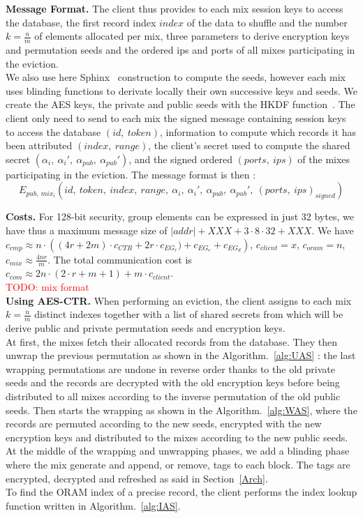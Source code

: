 \documentclass{llncs}
\newcommand{\todo}[1]{\textcolor{red}{TODO: #1}}
\begin{document}
\noindent\textbf{Message Format.}
The client thus provides to each mix session keys to access the database, the first record index $index$ of the data to shuffle and the number $k=\frac{n}{m}$ of elements allocated per mix, three parameters to derive encryption keys and permutation seeds and the ordered ips and ports of all mixes participating in the eviction.\\
We also use here Sphinx~\cite{danezis2009sphinx} construction to compute the seeds, however each mix uses blinding functions to derivate locally their own successive keys and seeds. 
We create the AES keys, the private and public seeds with the HKDF function~\cite{krawczyk2010cryptographic}. The client only need to send to each mix the signed message containing session keys to access the database $(id,\ token)$, information to compute which records it has been attributed $(index,\ range)$, the client's secret used to compute the shared secret $(\alpha_i,\ \alpha_i',\ \alpha_{pub},\ \alpha_{pub}')$, and the signed ordered $(ports,\ ips)$ of the mixes participating in the eviction.
The message format is then : $$E_{pub,\ mix_i}\left (id,\ token,\ index,\ range,\ \alpha_i,\ \alpha_i',\ \alpha_{pub},\ \alpha_{pub}',\ (port	s,\ ips)_{signed}\right )$$

\noindent\textbf{Costs.} For 128-bit security, group elements can be expressed in just 32 bytes, we have thus a maximum message size of $|addr|+XXX + 3 \cdot 8 \cdot 32 + XXX$. We have $c_{cmp} \approx n \cdot \left ( (4r+2m) \cdot c_{CTR} + 2 r \cdot c_{EG_r}) + c_{EG_e}+ c_{EG_d} \right ) $, $c_{client}= x$, $c_{oram}=n$, $c_{mix}\approx\frac{4nr}{m}$. The total communication cost is $c_{com}\approx 2n\cdot (2\cdot r+m+1) + m\cdot c_{client}$.\\\todo{ mix format}\\


\noindent\textbf{Using AES-CTR.}
When performing an eviction, the client assigns to each mix  $k=\frac{n}{m}$ distinct indexes together with a list of shared secrets from which will be derive public and private permutation seeds and encryption keys.\\
At first, the mixes fetch their allocated records from the database. They then unwrap the previous permutation as shown in the Algorithm.~\ref{alg:UAS} : the last wrapping permutations are undone in reverse order thanks to the old private seeds and the records are decrypted with the old encryption keys before being distributed to all mixes according to the inverse permutation of the old public seeds. Then starts the wrapping as shown in the Algorithm.~\ref{alg:WAS}, where the records are permuted according to the new seeds, encrypted with the new encryption keys and distributed to the mixes according to the new public seeds. At the middle of the wrapping and unwrapping phases, we add a blinding phase where the mix generate and append, or remove, tags to each block. The tags are encrypted, decrypted and refreshed as said in Section~\ref{Arch}.\\
To find the ORAM index of a precise record, the client performs the index lookup function written in Algorithm.~\ref{alg:IAS}.\\
\end{document}
